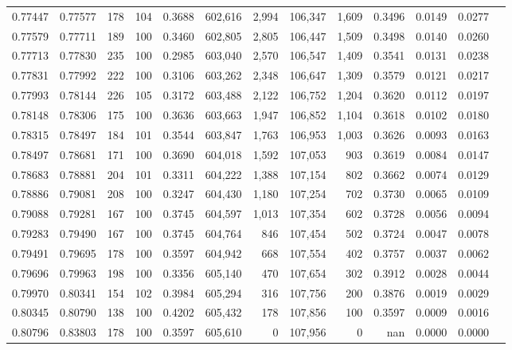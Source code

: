 \begin{tabular}{rrrrrrrrrrrrr}
0.77447 & 0.77577 &   178 & 104 &                                     0.3688 & 602,616 &   2,994 & 106,347 &   1,609 & 0.3496 & 0.0149 & 0.0277 \\
0.77579 & 0.77711 &   189 & 100 &                                     0.3460 & 602,805 &   2,805 & 106,447 &   1,509 & 0.3498 & 0.0140 & 0.0260 \\
0.77713 & 0.77830 &   235 & 100 &                                     0.2985 & 603,040 &   2,570 & 106,547 &   1,409 & 0.3541 & 0.0131 & 0.0238 \\
0.77831 & 0.77992 &   222 & 100 &                                     0.3106 & 603,262 &   2,348 & 106,647 &   1,309 & 0.3579 & 0.0121 & 0.0217 \\
0.77993 & 0.78144 &   226 & 105 &                                     0.3172 & 603,488 &   2,122 & 106,752 &   1,204 & 0.3620 & 0.0112 & 0.0197 \\
0.78148 & 0.78306 &   175 & 100 &                                     0.3636 & 603,663 &   1,947 & 106,852 &   1,104 & 0.3618 & 0.0102 & 0.0180 \\
0.78315 & 0.78497 &   184 & 101 &                                     0.3544 & 603,847 &   1,763 & 106,953 &   1,003 & 0.3626 & 0.0093 & 0.0163 \\
0.78497 & 0.78681 &   171 & 100 &                                     0.3690 & 604,018 &   1,592 & 107,053 &     903 & 0.3619 & 0.0084 & 0.0147 \\
0.78683 & 0.78881 &   204 & 101 &                                     0.3311 & 604,222 &   1,388 & 107,154 &     802 & 0.3662 & 0.0074 & 0.0129 \\
0.78886 & 0.79081 &   208 & 100 &                                     0.3247 & 604,430 &   1,180 & 107,254 &     702 & 0.3730 & 0.0065 & 0.0109 \\
0.79088 & 0.79281 &   167 & 100 &                                     0.3745 & 604,597 &   1,013 & 107,354 &     602 & 0.3728 & 0.0056 & 0.0094 \\
0.79283 & 0.79490 &   167 & 100 &                                     0.3745 & 604,764 &     846 & 107,454 &     502 & 0.3724 & 0.0047 & 0.0078 \\
0.79491 & 0.79695 &   178 & 100 &                                     0.3597 & 604,942 &     668 & 107,554 &     402 & 0.3757 & 0.0037 & 0.0062 \\
0.79696 & 0.79963 &   198 & 100 &                                     0.3356 & 605,140 &     470 & 107,654 &     302 & 0.3912 & 0.0028 & 0.0044 \\
0.79970 & 0.80341 &   154 & 102 &                                     0.3984 & 605,294 &     316 & 107,756 &     200 & 0.3876 & 0.0019 & 0.0029 \\
0.80345 & 0.80790 &   138 & 100 &                                     0.4202 & 605,432 &     178 & 107,856 &     100 & 0.3597 & 0.0009 & 0.0016 \\
0.80796 & 0.83803 &   178 & 100 &                                     0.3597 & 605,610 &       0 & 107,956 &       0 &    nan & 0.0000 & 0.0000 \\
\bottomrule
\end{tabular}
